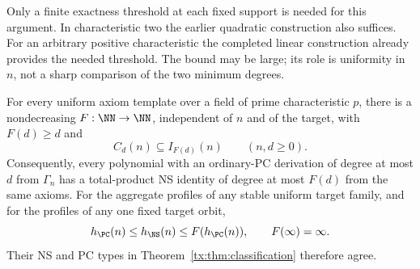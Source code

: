 Only a finite exactness threshold at each fixed support is needed for
this argument. In characteristic two the earlier quadratic construction also suffices.
For an arbitrary positive characteristic the completed linear construction
already provides the needed threshold. The
bound may be large; its role is uniformity in $n$, not a sharp comparison
of the two minimum degrees.

\begin{theorem}\label{tx:thm:comparison}
For every uniform axiom template over a field of prime characteristic
$p$, there is a nondecreasing $F:\NN\to\NN$, independent of $n$ and of
the target, with $F(d)\ge d$ and
\begin{equation}\label{tx:eq:whole-comparison}
                              C_d(n)\subseteq I_{F(d)}(n)
                       \qquad(n,d\ge0).
\end{equation}
Consequently, every polynomial with an ordinary-PC derivation of degree
at most $d$ from $\Gamma_n$ has a total-product NS identity of degree at
most $F(d)$ from the same axioms. For the aggregate profiles of any
stable uniform target family, and for the profiles of any one fixed
target orbit,
\begin{equation}\label{tx:eq:target-comparison}
                      h_{\PC}(n)\le h_{\NS}(n)\le F(h_{\PC}(n)),
                      \qquad F(\infty)=\infty.
\end{equation}
Their NS and PC types in Theorem~\ref{tx:thm:classification} therefore agree.
\end{theorem}
